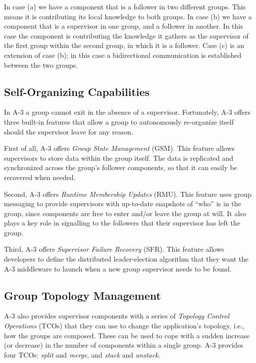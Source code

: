 \noindent In case (a) we have a component that is a follower in two different groups. This means it is contributing its local knowledge to both groups. In case (b) we have a component that is a supervisor in one group, and a follower in another. In this case the component is contributing the knowledge it gathers as the supervisor of the first group within the second group, in which it is a follower. Case (c) is an extension of case (b); in this case a bidirectional communication is established between the two groups. 

\subsection{Self-Organizing Capabilities}
\label{sub:self-organizing}

In A-3 a group cannot exit in the absence of a supervisor. Fortunately, A-3 offers three built-in features that allow a group to autonomously re-organize itself should the supervisor leave for any reason.

First of all, A-3 offers \emph{Group State Management} (GSM). This feature allows supervisors to store data within the group itself. The data is replicated and synchronized across the group's follower components, so that it can easily be recovered when needed. 

Second, A-3 offers \emph{Runtime Membership Updates} (RMU). This feature uses group messaging to provide supervisors with up-to-date snapshots of ``who'' is in the group, since components are free to enter and/or leave the group at will. It also plays a key role in signalling to the followers that their supervisor has left the group. 

Third, A-3 offers \emph{Supervisor Failure Recovery} (SFR). This feature allows developers to define the distributed leader-election algorithm that they want the A-3 middleware to launch when a new group supervisor needs to be found. 

\subsection{Group Topology Management}
\label{sub:topologyManagement}

A-3 also provides supervisor components with a series of \emph{Topology Control Operations} (TCOs) that they can use to change the application's topology, i.e., how the groups are composed. These can be used to cope with a sudden increase (or decrease) in the number of components within a single group. A-3 provides four TCOs: \emph{split} and \emph{merge}, and \emph{stack} and \emph{unstack}. 

